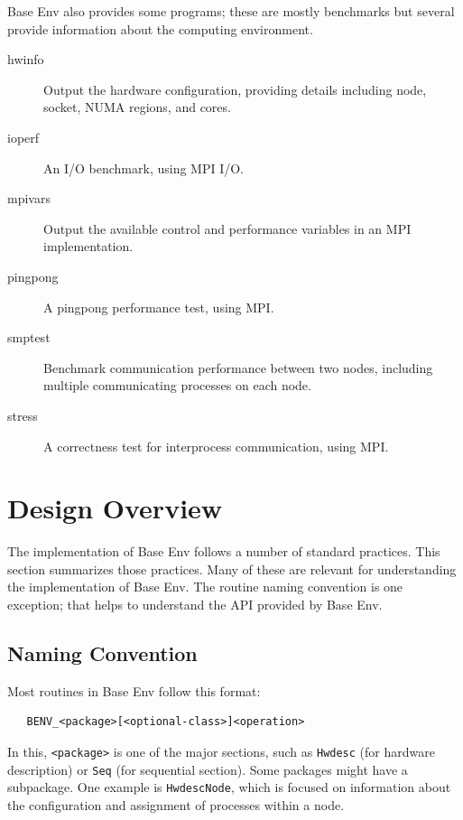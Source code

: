\documentclass[11pt,letterpaper]{report}
\begin{document}
Base Env also provides some programs; these are mostly benchmarks but
several provide information about the computing environment.
\begin{description}
\item[hwinfo]Output the hardware configuration, providing details
  including node, socket, NUMA regions, and cores.
\item[ioperf]An I/O benchmark, using MPI I/O.
\item[mpivars]Output the available control and performance variables
  in an MPI implementation.
\item[pingpong]A pingpong performance test, using MPI.
\item[smptest]Benchmark communication performance between two nodes,
  including multiple communicating processes on each node.
\item[stress]A correctness test for interprocess communication, using MPI.
\end{description}

\chapter{Design Overview}
The implementation of Base Env follows a number of standard
practices.
This section summarizes those practices.
Many of these are relevant for understanding the implementation of
Base Env.
The routine naming convention is one exception; that helps to
understand the API provided by Base Env.

\section{Naming Convention}
Most routines in Base Env follow this format:
\begin{verbatim}
   BENV_<package>[<optional-class>]<operation>
\end{verbatim}
In this, \texttt{<package>} is one of the major sections, such as
\texttt{Hwdesc} (for hardware description) or \texttt{Seq} (for
  sequential section).
Some packages might have a subpackage.
One example is \texttt{HwdescNode}, which is focused on information
about the configuration and assignment of processes within a node.
\end{document}
